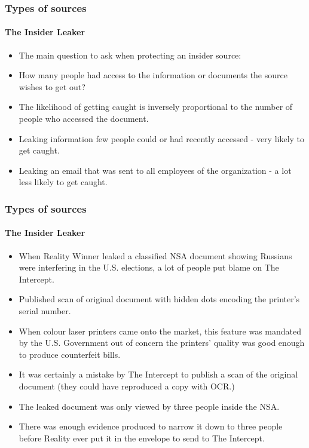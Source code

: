 \documentclass[aspectratio=169,usenames,dvipsnames]{beamer}
\begin{document}
\begin{frame}
  \frametitle{Types of sources}
  \framesubtitle{The Insider Leaker}

  \begin{itemize}[<+->]
    \item The main question to ask when protecting an insider source:
    \item How many people had access to the information or documents the
      source wishes to get out?
    \item The likelihood of getting caught is inversely proportional to the
      number of people who accessed the document.
    \item Leaking information few people could or had recently accessed - very
      likely to get caught.
    \item Leaking an email that was sent to all employees of the
      organization - a lot less likely to get caught.
  \end{itemize}

\end{frame}

\begin{frame}
  \frametitle{Types of sources}
  \framesubtitle{The Insider Leaker}

  \begin{itemize}[<+->]
    \item When Reality Winner leaked a classified NSA document showing
      Russians were interfering in the U.S. elections, a lot of people put
      blame on The Intercept.
    \item Published scan of original document with hidden dots encoding the
      printer's serial number.
    \item When colour laser printers came onto the market, this
      feature was mandated by the U.S. Government out of concern the printers'
      quality was good enough to produce counterfeit bills.
    \item It was certainly a mistake by The Intercept to publish a scan of the
      original document (they could have reproduced a copy with OCR.)
    \item The leaked document was only viewed by three people inside the NSA.
    \item There was enough evidence produced to narrow it down to three people
      before Reality ever put it in the envelope to send to The Intercept.
  \end{itemize}

\end{frame}
\end{document}

